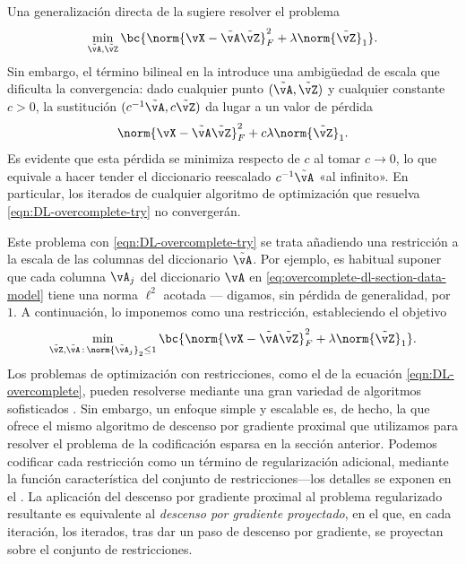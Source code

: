 \documentclass[../../book-main.tex]{subfiles}
\begin{document}
Una generalización directa de la  sugiere
resolver el problema
\begin{equation}
    \min_{\tilde{\vA}, \tilde{\vZ}}\bc{\norm{\vX -
    \tilde{\vA}\tilde{\vZ}}_{F}^{2} + \lambda \norm{\tilde{\vZ}}_{1}}.
    \label{eqn:DL-overcomplete-try}
\end{equation}
Sin embargo, el término bilineal en la 
introduce una ambigüedad de escala
que dificulta la convergencia: dado cualquier punto $(\tilde{\vA},
\tilde{\vZ})$ y cualquier constante $c>0$, la sustitución
$(c^{-1}\tilde{\vA}, c\tilde{\vZ})$ da lugar a un valor de pérdida 
\begin{equation}
    \norm{\vX - \tilde{\vA}\tilde{\vZ}}_{F}^{2} + c\lambda
    \norm{\tilde{\vZ}}_{1}.
\end{equation}
Es evidente que esta pérdida se minimiza respecto de $c$ al tomar $c \to 0$,
lo que equivale a hacer tender el diccionario reescalado $c^{-1} \tilde{\vA}$ 
«al infinito». En particular, los iterados de cualquier algoritmo 
de optimización que resuelva \eqref{eqn:DL-overcomplete-try} no convergerán.

Este problema con \eqref{eqn:DL-overcomplete-try} se trata añadiendo
una restricción a la escala de las columnas del diccionario $\tilde{\vA}$.
Por ejemplo, es habitual suponer que cada columna $\vA_j$ del
diccionario $\vA$ en \eqref{eq:overcomplete-dl-section-data-model} tiene una norma $\ell^2$
acotada --- digamos, sin pérdida de generalidad, por $1$.
A continuación, lo imponemos como una restricción, estableciendo el objetivo
\begin{equation}
    \min_{\tilde{\vZ}, \tilde{\vA} \,:\, \norm{\tilde{\vA}_j}_2 \leq 1}
    \bc{\norm{\vX - \tilde{\vA}\tilde{\vZ}}_{F}^{2} + \lambda
    \norm{\tilde{\vZ}}_{1}}.
    \label{eqn:DL-overcomplete}
\end{equation}
Los problemas de optimización con restricciones, como el de la ecuación \eqref{eqn:DL-overcomplete},
pueden resolverse mediante una gran variedad de algoritmos sofisticados
\cite{nocedal2006numerical}. Sin embargo, un enfoque simple y escalable es, de hecho,
la que ofrece el mismo algoritmo de descenso por gradiente proximal que
utilizamos para resolver el problema de la codificación esparsa en la sección anterior.
Podemos codificar cada restricción como un término de regularización adicional, mediante la
función característica del conjunto de restricciones---los detalles se exponen en el
.
La aplicación del descenso por gradiente proximal al problema regularizado resultante es
equivalente al \textit{descenso por gradiente proyectado}, en el que, en
cada iteración, los iterados, tras dar un paso de descenso por gradiente, se proyectan sobre el
conjunto de restricciones.
\end{document}
